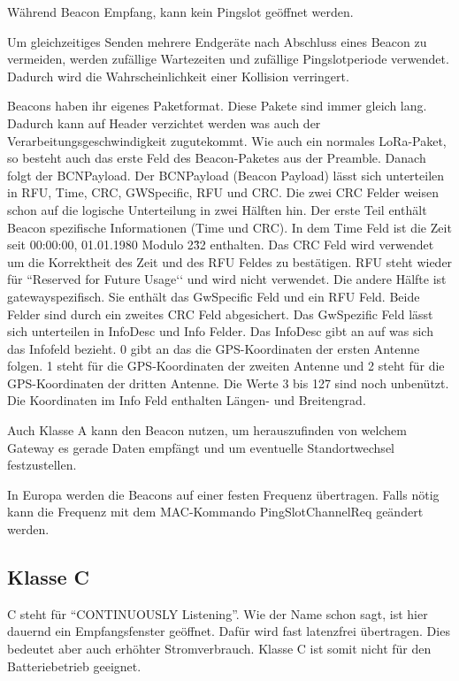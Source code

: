 \documentclass[a4paper, 12pt]{article}
\begin{document}
                Während Beacon Empfang, kann kein Pingslot geöffnet werden.
                
                Um gleichzeitiges Senden mehrere Endgeräte nach Abschluss eines Beacon zu vermeiden,
                werden zufällige Wartezeiten und zufällige Pingslotperiode verwendet. Dadurch wird die Wahrscheinlichkeit 
                einer Kollision verringert.

                Beacons haben ihr eigenes Paketformat. Diese Pakete sind immer gleich lang. Dadurch kann auf Header 
                verzichtet werden was auch der Verarbeitungsgeschwindigkeit zugutekommt. Wie auch ein normales 
                LoRa-Paket, so besteht auch das erste Feld des Beacon-Paketes aus der Preamble. Danach folgt der 
                BCNPayload. Der BCNPayload (Beacon Payload) lässt sich unterteilen in RFU, Time, CRC, GWSpecific, 
                RFU und CRC. Die zwei CRC Felder weisen schon auf die logische Unterteilung in zwei Hälften hin. Der 
                erste Teil enthält Beacon spezifische Informationen (Time und CRC). In dem Time Feld ist die Zeit 
                seit 00:00:00, 01.01.1980 Modulo 2\^32 enthalten. Das CRC Feld wird verwendet um die Korrektheit des 
                Zeit und des RFU Feldes zu bestätigen. RFU steht wieder für ``Reserved for Future Usage‘‘ und wird 
                nicht verwendet. Die andere Hälfte ist gatewayspezifisch. Sie enthält das GwSpecific Feld und ein 
                RFU Feld. Beide Felder sind durch ein zweites CRC Feld abgesichert. Das GwSpezific Feld lässt 
                sich unterteilen in InfoDesc und Info Felder. Das InfoDesc gibt an auf was sich das Infofeld bezieht. 
                0 gibt an das die GPS-Koordinaten der ersten Antenne folgen. 1 steht für die GPS-Koordinaten der 
                zweiten Antenne und 2 steht für die GPS-Koordinaten der dritten Antenne. Die Werte 3 bis 127 sind noch unbenützt.
                Die Koordinaten im Info Feld enthalten Längen- und Breitengrad.
                
                Auch Klasse A kann den Beacon nutzen, um herauszufinden von welchem Gateway es gerade Daten empfängt 
                und um eventuelle Standortwechsel festzustellen.
                
                In Europa werden die Beacons auf einer festen Frequenz übertragen. Falls nötig kann die Frequenz mit dem  
                MAC-Kommando PingSlotChannelReq geändert werden.
        \subsection{Klasse C}
            C steht für ``CONTINUOUSLY Listening''. Wie der Name schon sagt, ist hier dauernd ein Empfangsfenster geöffnet.
            Dafür wird fast latenzfrei übertragen. Dies bedeutet aber auch erhöhter Stromverbrauch. Klasse C ist somit 
            nicht für den Batteriebetrieb geeignet. 
\end{document}
